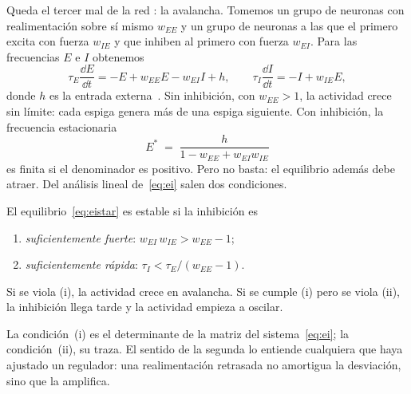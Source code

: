 Queda el tercer mal de la red : la avalancha. Tomemos un grupo de neuronas  con realimentación sobre sí mismo $w_{EE}$ y un grupo de neuronas  a las que el primero excita con fuerza $w_{IE}$ y que inhiben al primero con fuerza $w_{EI}$. Para las frecuencias $E$ e $I$ obtenemos
\begin{equation}
\tau_E\frac{\dd E}{\dd t} = -E + w_{EE}E - w_{EI}I + h, \qquad
\tau_I\frac{\dd I}{\dd t} = -I + w_{IE}E ,
\label{eq:ei}
\end{equation}
donde $h$ es la entrada externa~\cite{WilsonCowan1972}. Sin inhibición, con $w_{EE}>1$, la actividad crece sin límite: cada espiga genera más de una espiga siguiente. Con inhibición, la frecuencia estacionaria
\begin{equation}
E^* \;=\; \frac{h}{1-w_{EE}+w_{EI}w_{IE}}
\label{eq:eistar}
\end{equation}
es finita si el denominador es positivo. Pero no basta: el equilibrio además debe atraer. Del análisis lineal de~\eqref{eq:ei} salen dos condiciones.

\begin{keyblock}
\begin{proposition}
\label{prop:ei}
El equilibrio~\eqref{eq:eistar} es estable si la inhibición es
\begin{enumerate}
\item[(i)] \emph{suficientemente fuerte}: $w_{EI}\,w_{IE} > w_{EE}-1$;
\item[(ii)] \emph{suficientemente rápida}: $\tau_I < \tau_E/(w_{EE}-1)$.
\end{enumerate}
Si se viola (i), la actividad crece en avalancha. Si se cumple (i) pero se viola (ii), la inhibición llega tarde y la actividad empieza a oscilar.
\end{proposition}
\end{keyblock}

La condición~(i) es el determinante de la matriz del sistema~\eqref{eq:ei}; la condición~(ii), su traza. El sentido de la segunda lo entiende cualquiera que haya ajustado un regulador: una realimentación retrasada no amortigua la desviación, sino que la amplifica.

